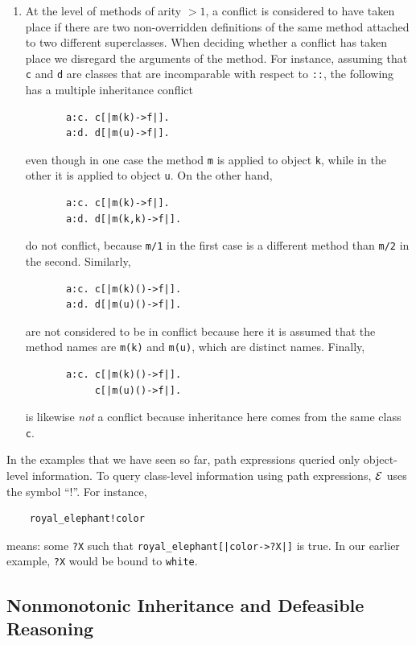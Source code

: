 \documentclass[11pt]{article}
\newcommand{\ERGO}{\mbox{\ensuremath{\cal{E}}\smaller{{\sc{RGO}}}}\xspace}
\newcommand{\FLSYSTEM}{\ERGO}
\begin{document}
\begin{enumerate}
\item At the level of methods of arity $>1$, a conflict is considered to have
  taken place if there are two non-overridden definitions of the same method
  attached to two different superclasses. When deciding whether a conflict
  has taken place we disregard the arguments of the method. For instance,
  assuming that \texttt{c} and \texttt{d} are classes that are
  incomparable with
  respect to \texttt{::}, the following has a multiple inheritance conflict 
\begin{verbatim}
       a:c. c[|m(k)->f|].    
       a:d. d[|m(u)->f|].     
\end{verbatim}
  even though in one case
  the method {\tt m} is applied to object {\tt k}, while in the other it is
  applied to object {\tt u}. 
  On the other hand,
\begin{verbatim}
       a:c. c[|m(k)->f|].    
       a:d. d[|m(k,k)->f|].     
\end{verbatim}
  do not conflict, because {\tt m/1} in the first case is a different
  method than {\tt m/2} in the second. Similarly,
\begin{verbatim}
       a:c. c[|m(k)()->f|].    
       a:d. d[|m(u)()->f|].     
\end{verbatim}
  are not considered to be in conflict because here it is assumed that the
  method names are {\tt m(k)} and {\tt m(u)}, which are distinct names.
  Finally,
\begin{verbatim}
       a:c. c[|m(k)()->f|].    
            c[|m(u)()->f|].     
\end{verbatim}
  is likewise \emph{not} a conflict because inheritance here comes from the same
  class \texttt{c}.
\end{enumerate}

In the examples that we have seen so far, path expressions queried only
object-level information. To query class-level information using path
expressions, \FLSYSTEM uses the symbol ``!''. For instance,
\begin{verbatim}
    royal_elephant!color
\end{verbatim}
means: some \texttt{?X}  such that \texttt{royal\_elephant[|color->?X|]} is
true.  In our earlier example, \texttt{?X} would be bound to
\texttt{white}.  

\subsection{Nonmonotonic Inheritance and Defeasible Reasoning}
\end{document}
